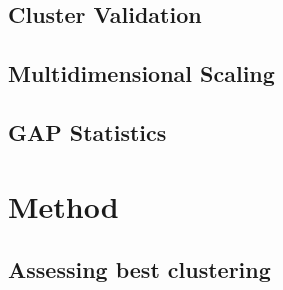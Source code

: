 \documentclass[a4paper,10pt]{article}
\theoremstyle{plain}
\theoremstyle{definition}
\begin{document}
\subsection{Cluster Validation}

\subsection{Multidimensional Scaling}

\subsection{GAP Statistics}

\newpage
\section{Method}

\subsection{Assessing best clustering}
\end{document}
